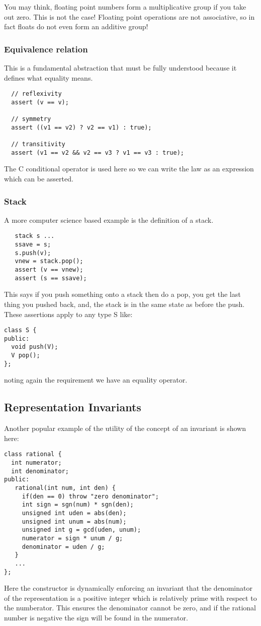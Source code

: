 \documentclass[oneside]{book}
\theoremstyle{plain}
\theoremstyle{definition}
\theoremstyle{plain}
\begin{document}
You may think, floating point numbers form a multiplicative group
if you take out zero. This is not the case! Floating point operations
are not associative, so in fact floats do not even form an additive group!


\subsubsection{Equivalence relation}
This is a fundamental abstraction that must be fully understood
because it defines what equality means.

\begin{verbatim}
  // reflexivity
  assert (v == v);

  // symmetry 
  assert ((v1 == v2) ? v2 == v1) : true);

  // transitivity
  assert (v1 == v2 && v2 == v3 ? v1 == v3 : true);
\end{verbatim}

The C conditional operator is used here so we can write the law
as an expression which can be asserted.


\subsubsection{Stack}
A more computer science based example is the definition of a stack.

\begin{verbatim}
   stack s ...
   ssave = s;
   s.push(v);
   vnew = stack.pop();
   assert (v == vnew);
   assert (s == ssave);
\end{verbatim}

This says if you push something onto a stack then do a pop, you get
the last thing you pushed back, and, the stack is in the same state
as before the push.  These assertions apply to any type S like:

\begin{verbatim}
class S {
public:
  void push(V);
  V pop();
};
\end{verbatim}

noting again the requirement we have an equality operator.

\subsection{Representation Invariants}
Another popular example of the utility of the concept of an invariant
is shown here:
\begin{verbatim}
class rational {
  int numerator;
  int denominator;
public:
   rational(int num, int den) {
     if(den == 0) throw "zero denominator";
     int sign = sgn(num) * sgn(den);
     unsigned int uden = abs(den);
     unsigned int unum = abs(num);
     unsigned int g = gcd(uden, unum);
     numerator = sign * unum / g;
     denominator = uden / g;
   }
   ...
};
\end{verbatim}
Here the constructor is dynamically enforcing an invariant that
the denominator of the representation is a positive integer
which is relatively prime with respect to the numberator.
This ensures the denominator cannot be zero, and if the rational
number is negative the sign will be found in the numerator.
\end{document}
